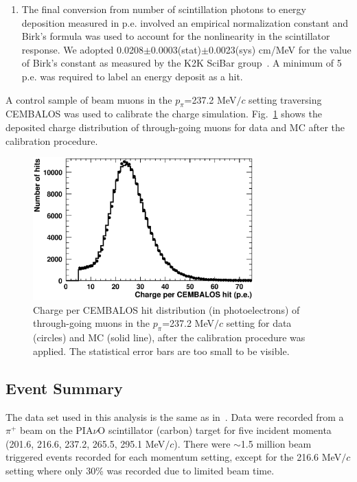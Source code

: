 \begin{enumerate}
\item{The final conversion from number of scintillation photons to energy deposition measured in p.e. involved  an empirical normalization constant and Birk's formula was used to account for the nonlinearity in the scintillator response. We adopted 0.0208$\pm$0.0003(stat)$\pm$0.0023(sys) cm/MeV for the value of Birk's constant as measured by the K2K SciBar group~\cite{scibar}. A minimum of 5 p.e. was required to label an energy deposit as a hit.}
\end{enumerate}

A control sample of beam muons in the $p_{\pi}$=237.2 MeV$/c$ setting traversing CEMBALOS was used to calibrate the charge simulation. Fig.~\ref{fig:muoncharge} shows the deposited charge distribution of through-going muons for data and MC after the calibration procedure. 

\begin{figure}[!h]
\begin{center}
\includegraphics[width=85mm]{figures/muon_charge_calib.eps}
\caption{Charge per CEMBALOS hit distribution (in photoelectrons) of through-going muons in the $p_{\pi}$=237.2 MeV$/c$ setting for data (circles) and MC (solid line), after the calibration procedure was applied. The statistical error bars are too small to be visible.}
\label{fig:muoncharge}
\end{center}
\end{figure}

\subsection{Event Summary}
The data set used in this analysis is the same as in~\cite{duet}. Data were recorded from a $\pi^{+}$ beam on the PIA$\nu$O scintillator (carbon) target for five incident momenta (201.6, 216.6, 237.2, 265.5, 295.1 MeV$/c$). There were $\sim$1.5 million beam triggered events recorded for each momentum setting, except for the 216.6 MeV$/c$ setting where only 30\% was recorded due to limited beam time.
